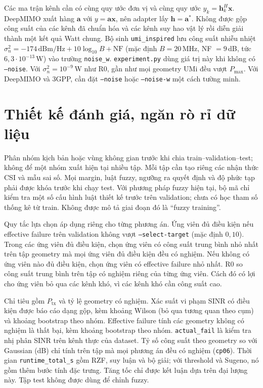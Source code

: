 \documentclass[11pt,onecolumn]{IEEEtran}
\begin{document}
Các ma trận kênh cần có cùng quy ước đơn vị và cùng quy ước $y_k=\mathbf h_k^H\mathbf x$. DeepMIMO xuất hàng $\mathbf a$ với $y=\mathbf a\mathbf x$, nên adapter lấy $\mathbf h=\mathbf a^*$. Không được gộp công suất của các kênh đã chuẩn hóa và các kênh suy hao vật lý rồi diễn giải thành một kết quả Watt chung. Bộ sinh \texttt{umi\_inspired} lưu công suất nhiễu nhiệt $\sigma_n^2=-174\,\mathrm{dBm/Hz}+10\log_{10}B+\mathrm{NF}$ (mặc định $B=20$\,MHz, NF $=9$\,dB, tức $6{,}3\cdot10^{-13}$\,W) vào trường \texttt{noise\_w}. \texttt{experiment.py} dùng giá trị này khi không có \texttt{--noise}. Với $\sigma_n^2=10^{-9}$\,W như R0, gần như mọi geometry UMi đều vượt $P_{\max}$. Với DeepMIMO và 3GPP, cần đặt \texttt{--noise} hoặc \texttt{--noise-w} một cách tường minh.
\section{Thiết kế đánh giá, ngăn rò rỉ dữ liệu}
Phân nhóm kịch bản hoặc vùng không gian trước khi chia train--validation--test; không để một nhóm xuất hiện tại nhiều tập. Mỗi tập cần tạo riêng các nhận thức CSI và mẫu sai số. Mọi margin, luật fuzzy, ngưỡng ra quyết định và độ phức tạp phải được khóa trước khi chạy test. Với phương pháp fuzzy hiện tại, bộ mã chỉ kiểm tra một số cấu hình luật thiết kế trước trên validation; chưa có học tham số thống kê từ train. Không được mô tả giai đoạn đó là ``fuzzy training''.

Quy tắc lựa chọn áp dụng riêng cho từng phương án. Ứng viên đủ điều kiện nếu effective failure trên validation không vượt \texttt{--select-target} (mặc định $0{,}10$). Trong các ứng viên đủ điều kiện, chọn ứng viên có công suất trung bình nhỏ nhất trên tập geometry mà mọi ứng viên đủ điều kiện đều có nghiệm. Nếu không có ứng viên nào đủ điều kiện, chọn ứng viên có effective failure nhỏ nhất. R0 so công suất trung bình trên tập có nghiệm riêng của từng ứng viên. Cách đó có lợi cho ứng viên bỏ qua các kênh khó, vì các kênh khó cần công suất cao.

Chỉ tiêu gồm $P_{\mathrm{tx}}$ và tỷ lệ geometry có nghiệm. Xác suất vi phạm SINR có điều kiện được báo cáo dạng gộp, kèm khoảng Wilson (bỏ qua tương quan theo cụm) và khoảng bootstrap theo nhóm. Effective failure tính các geometry không có nghiệm là thất bại, kèm khoảng bootstrap theo nhóm. \texttt{actual\_fail} là kiểm tra nhị phân SINR trên kênh thực của dataset. Tỷ số công suất theo geometry so với Gaussian (dB) chỉ tính trên tập mà mọi phương án đều có nghiệm (\texttt{cp06}). Thời gian \texttt{runtime\_total\_s} gồm RZF, suy luận và bộ giải; với threshold và Sugeno, nó gồm thêm bước tính đặc trưng. Tăng tốc chỉ được kết luận dựa trên đại lượng này. Tập test không được dùng để chỉnh fuzzy.
\end{document}
